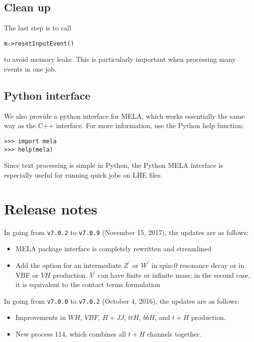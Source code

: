 \documentclass[aps,superscriptaddress,nofootinbib]{revtex4}
\begin{document}
\subsection{Clean up}
The last step is to call
\begin{verbatim}
m->resetInputEvent()
\end{verbatim}
to avoid memory leaks.  This is particularly important when processing many events in one job.

\subsection{Python interface}
We also provide a python interface for MELA, which works essentially the same way as the C++ interface.  For more information, use the Python help function:
\begin{verbatim}
>>> import mela
>>> help(mela)
\end{verbatim}
Since text processing is simple in Python, the Python MELA interface is especially useful for running quick jobs on LHE files.

\section{Release notes}

\noindent
In going from \verb|v7.0.2| to \verb|v7.0.9| (November 15, 2017), the updates are as follows:

\begin{itemize}
	\item MELA package interface is completely rewritten and streamlined
	\item Add the option for an intermediate $Z^\prime$ or $W^\prime$ in spin-0 resonance decay or in VBF or $VH$ production.  $V^\prime$ can have finite or infinite mass; in the second case, it is equivalent to the contact terms formulation~\cite{Gonzalez-Alonso:2014eva}
\end{itemize}

\noindent
In going from \verb|v7.0.0| to \verb|v7.0.2| (October 4, 2016), the updates are as follows:

\begin{itemize}
	\item Improvements in $WH$, $VBF$, $H+JJ$, $ttH$, $bbH$, and $t+H$ production.
	\item New process 114, which combines all $t+H$ channels together.
\end{itemize}
\end{document}
